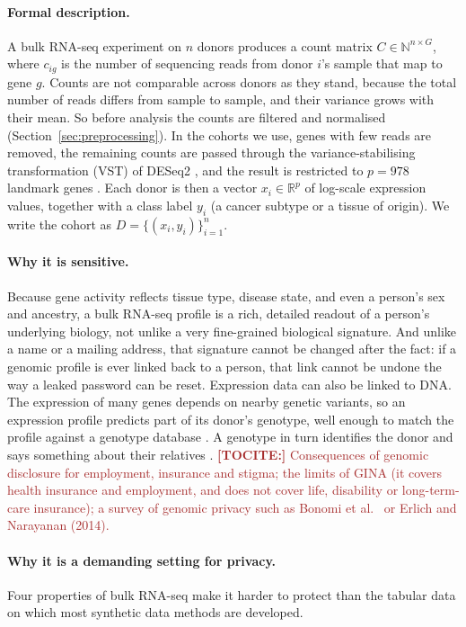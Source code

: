 \documentclass[webpdf,contemporary,large]{oup-authoring-template}
\newif\ifdraft \drafttrue
\newcommand{\annot}[3]{\ifdraft\textcolor{#1}{\textbf{[#2:]} #3}\fi}
\newcommand{\tocite}[1]{\annot{Brown}{TOCITE}{#1}}
\begin{document}
\paragraph{Formal description.}
A bulk RNA-seq experiment on $n$ donors produces a count matrix $C \in \mathbb{N}^{n \times G}$, where $c_{ig}$ is the number of sequencing reads from donor $i$'s sample that map to gene $g$. Counts are not comparable across donors as they stand, because the total number of reads differs from sample to sample, and their variance grows with their mean. So before analysis the counts are filtered and normalised (Section~\ref{sec:preprocessing}). In the cohorts we use, genes with few reads are removed, the remaining counts are passed through the variance-stabilising transformation (VST) of DESeq2 \citep{love2014deseq2}, and the result is restricted to $p = 978$ landmark genes \citep{subramanian2017l1000}. Each donor is then a vector $x_i \in \mathbb{R}^{p}$ of log-scale expression values, together with a class label $y_i$ (a cancer subtype or a tissue of origin). We write the cohort as $D = \{(x_i, y_i)\}_{i=1}^{n}$.

\paragraph{Why it is sensitive.}
Because gene activity reflects tissue type, disease state, and even a person's sex and ancestry, a bulk RNA-seq profile is a rich, detailed readout of a person's underlying biology, not unlike a very fine-grained biological signature. And unlike a name or a mailing address, that signature cannot be changed after the fact: if a genomic profile is ever linked back to a person, that link cannot be undone the way a leaked password can be reset. Expression data can also be linked to DNA. The expression of many genes depends on nearby genetic variants, so an expression profile predicts part of its donor's genotype, well enough to match the profile against a genotype database \citep{schadt2012bayesian,harmanci2016quantification}. A genotype in turn identifies the donor and says something about their relatives \citep{erlich2018identity}.
\tocite{Consequences of genomic disclosure for employment, insurance and stigma; the limits of GINA (it covers health insurance and employment, and does not cover life, disability or long-term-care insurance); a survey of genomic privacy such as Bonomi et al.\ \citep{bonomi_privacy_2020} or Erlich and Narayanan (2014).}

\paragraph{Why it is a demanding setting for privacy.}
Four properties of bulk RNA-seq make it harder to protect than the tabular data on which most synthetic data methods are developed.
\end{document}
